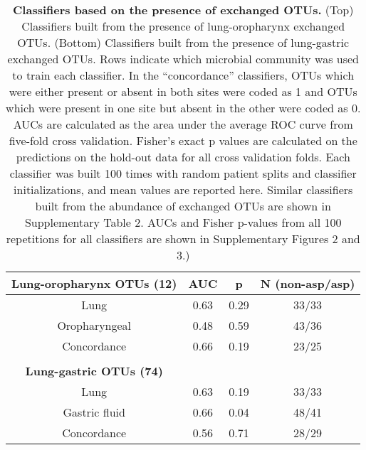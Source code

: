 \documentclass{article}
\begin{document}
\begin{table}
\begin{center}

\begin{tabular}{cccc}  
\textbf{Lung-oropharynx OTUs (12)} & AUC & p & N (non-asp/asp) \\
\toprule
Lung & 0.63 & 0.29 & 33/33 \\
Oropharyngeal & 0.48 & 0.59 & 43/36 \\
Concordance & 0.66 & 0.19 & 23/25 \\
\bottomrule
\\

\textbf{Lung-gastric OTUs (74)} & & & \\
\toprule
Lung & 0.63 & 0.19 & 33/33 \\
Gastric fluid & 0.66 & 0.04 & 48/41 \\
Concordance & 0.56 & 0.71 & 28/29 \\
\bottomrule
\end{tabular}

\caption{\textbf{Classifiers based on the presence of exchanged OTUs.} (Top) Classifiers built from the presence of lung-oropharynx exchanged OTUs. (Bottom) Classifiers built from the presence of lung-gastric exchanged OTUs. Rows indicate which microbial community was used to train each classifier. In the ``concordance'' classifiers, OTUs which were either present or absent in both sites were coded as 1 and OTUs which were present in one site but absent in the other were coded as 0. AUCs are calculated as the area under the average ROC curve from five-fold cross validation. Fisher's exact p values are calculated on the predictions on the hold-out data for all cross validation folds. Each classifier was built 100 times with random patient splits and classifier initializations, and mean values are reported here. Similar classifiers built from the abundance of exchanged OTUs are shown in Supplementary Table 2. AUCs and Fisher p-values from all 100 repetitions for all classifiers are shown in Supplementary Figures 2 and 3.) }\label{tab:exchange-classifiers}
\end{center}
\end{table}
\end{document}
